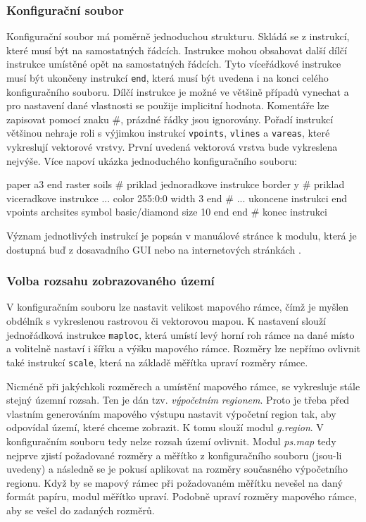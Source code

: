\documentclass[a4paper,12pt,draft]{article}
\newcommand{\modul}[1]{\emph{#1}}
\newcommand{\instr}[1]{\lstinline[style=psmapInline]|#1|}
\begin{document}
\subsubsection{Konfigurační soubor}
Konfigurační soubor má poměrně jednoduchou strukturu. Skládá se z instrukcí, které musí být na samostatných řádcích. Instrukce mohou obsahovat další dílčí instrukce umístěné opět na samostatných řádcích. Tyto víceřádkové instrukce musí být ukončeny  instrukcí \instr{end}, která musí být uvedena i na konci celého konfiguračního souboru. Dílčí instrukce je možné ve většině případů vynechat a pro nastavení dané vlastnosti se použije implicitní hodnota. Komentáře lze zapisovat pomocí znaku \#, prázdné řádky jsou ignorovány. Pořadí instrukcí většinou nehraje roli s výjimkou instrukcí \instr{vpoints}, \instr{vlines} a \instr{vareas}, které vykreslují vektorové vrstvy. První uvedená vektorová vrstva bude vykreslena nejvýše. Více napoví ukázka jednoduchého konfiguračního souboru:
\begin{psmap}
paper a3
end
raster soils            # priklad jednoradkove instrukce
border y                # priklad viceradkove instrukce ...
   color 255:0:0
   width 3
end                     # ... ukoncene instrukci end
vpoints archsites
   symbol basic/diamond
   size 10
end
end                     # konec instrukci
\end{psmap}
Význam jednotlivých instrukcí je popsán v manuálové stránce k modulu, která je dostupná buď z dosavadního GUI nebo na internetových stránkách \cite{manual}.

\subsubsection{Volba rozsahu zobrazovaného území}
\label{sec:psmap:rozsah}
V konfiguračním souboru lze nastavit velikost mapového rámce, čímž je myšlen obdélník s vykreslenou rastrovou či vektorovou mapou.  K nastavení slouží jednořádková instrukce \instr{maploc}, která umístí levý horní roh rámce na dané místo a volitelně nastaví i šířku a výšku mapového rámce. Rozměry lze nepřímo ovlivnit také instrukcí \instr{scale}, která na základě měřítka upraví rozměry rámce.

Nicméně při jakýchkoli rozměrech a umístění mapového rámce, se vykresluje stále stejný územní rozsah. Ten je dán tzv. \emph{výpočetním regionem}. Proto je třeba před vlastním generováním mapového výstupu nastavit výpočetní region tak, aby odpovídal území, které chceme zobrazit. K tomu slouží modul \modul{g.region}. V konfiguračním souboru tedy nelze rozsah území ovlivnit.
Modul \modul{ps.map} tedy nejprve zjistí požadované rozměry a měřítko z konfiguračního souboru (jsou-li uvedeny) a následně se je pokusí aplikovat na rozměry současného výpočetního regionu. Když by se mapový rámec při požadovaném měřítku nevešel na daný formát papíru, modul měřítko upraví. Podobně upraví rozměry mapového rámce, aby se vešel do zadaných rozměrů.
\end{document}
